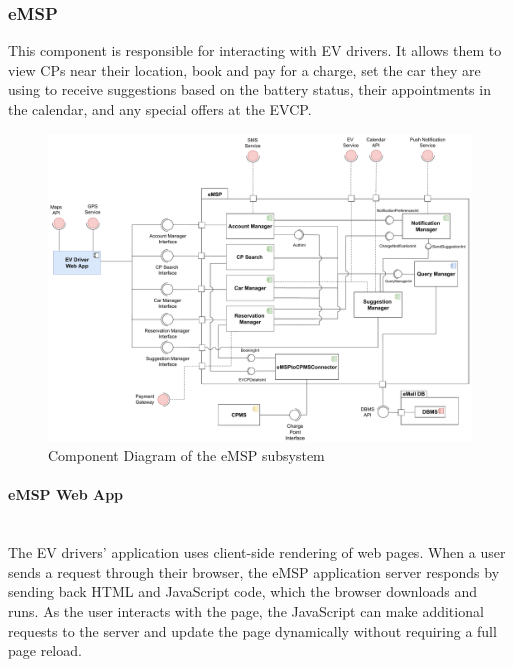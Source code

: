 \subsubsection{eMSP}
This component is responsible for interacting with EV drivers. It allows them to view CPs near their location, book and pay for a charge, set the car they are using to receive suggestions based on the battery status, their appointments in the calendar, and any special offers at the EVCP.
\begin{figure}[H]
    \centering
    \hspace*{-2cm}
    \includegraphics[scale=0.48]{src/ComponentDiagram/emsp_component_diagram.pdf}
    \caption{Component Diagram of the eMSP subsystem}
\end{figure}

\paragraph*{eMSP Web App} \hfill \\
The EV drivers' application uses client-side rendering of web pages. When a user sends a request through their browser, the eMSP application server responds by sending back HTML and JavaScript code, which the browser downloads and runs. As the user interacts with the page, the JavaScript can make additional requests to the server and update the page dynamically without requiring a full page reload.

